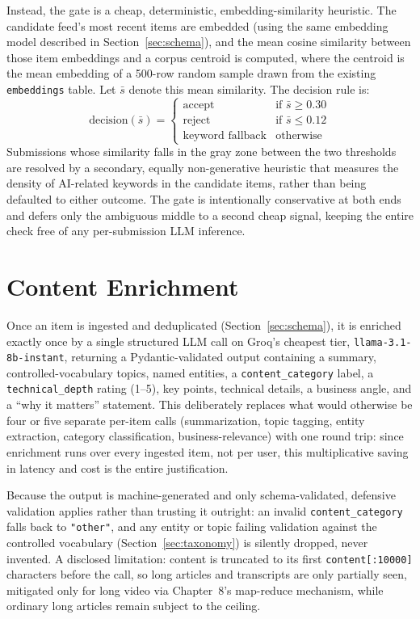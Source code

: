 Instead, the gate is a cheap, deterministic, embedding-similarity heuristic. The candidate feed's most recent items are embedded (using the same embedding model described in Section~\ref{sec:schema}), and the mean cosine similarity between those item embeddings and a corpus centroid is computed, where the centroid is the mean embedding of a 500-row random sample drawn from the existing \texttt{embeddings} table. Let $\bar{s}$ denote this mean similarity. The decision rule is:
\begin{equation}
\label{eq:relevance-gate}
\text{decision}(\bar{s}) =
\begin{cases}
\text{accept} & \text{if } \bar{s} \geq 0.30 \\[2pt]
\text{reject} & \text{if } \bar{s} \leq 0.12 \\[2pt]
\text{keyword fallback} & \text{otherwise}
\end{cases}
\end{equation}
Submissions whose similarity falls in the gray zone between the two thresholds are resolved by a secondary, equally non-generative heuristic that measures the density of AI-related keywords in the candidate items, rather than being defaulted to either outcome. The gate is intentionally conservative at both ends and defers only the ambiguous middle to a second cheap signal, keeping the entire check free of any per-submission LLM inference.

\section{Content Enrichment}
\label{sec:enrichment}

Once an item is ingested and deduplicated (Section~\ref{sec:schema}), it is enriched exactly once by a single structured LLM call on Groq's cheapest tier, \texttt{llama-3.1-8b-instant}, returning a Pydantic-validated output containing a summary, controlled-vocabulary topics, named entities, a \texttt{content\_category} label, a \texttt{technical\_depth} rating (1--5), key points, technical details, a business angle, and a ``why it matters'' statement. This deliberately replaces what would otherwise be four or five separate per-item calls (summarization, topic tagging, entity extraction, category classification, business-relevance) with one round trip: since enrichment runs over every ingested item, not per user, this multiplicative saving in latency and cost is the entire justification.

Because the output is machine-generated and only schema-validated, defensive validation applies rather than trusting it outright: an invalid \texttt{content\_category} falls back to \texttt{"other"}, and any entity or topic failing validation against the controlled vocabulary (Section~\ref{sec:taxonomy}) is silently dropped, never invented. A disclosed limitation: content is truncated to its first \texttt{content[:10000]} characters before the call, so long articles and transcripts are only partially seen, mitigated only for long video via Chapter~8's map-reduce mechanism, while ordinary long articles remain subject to the ceiling.

